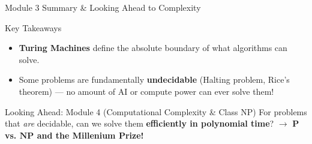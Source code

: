 \documentclass[aspectratio=169,10pt]{beamer}
\begin{document}
\begin{frame}{Module 3 Summary \& Looking Ahead to Complexity}
    \begin{block}{Key Takeaways}
        \begin{itemize}\setlength{\itemsep}{3pt}
            \item \textbf{Turing Machines} define the absolute boundary of what algorithms can solve.
            \item Some problems are fundamentally \textbf{undecidable} (Halting problem, Rice's theorem) --- no amount of AI or compute power can ever solve them!
        \end{itemize}
    \end{block}
    
    \begin{exampleblock}{Looking Ahead: Module 4 (Computational Complexity \& Class NP)}
        For problems that \textit{are} decidable, can we solve them \textbf{efficiently in polynomial time}? $\to$ \textbf{$\mathbf{P}$ vs. $\mathbf{NP}$ and the Millenium Prize!}
    \end{exampleblock}
\end{frame}
\end{document}
